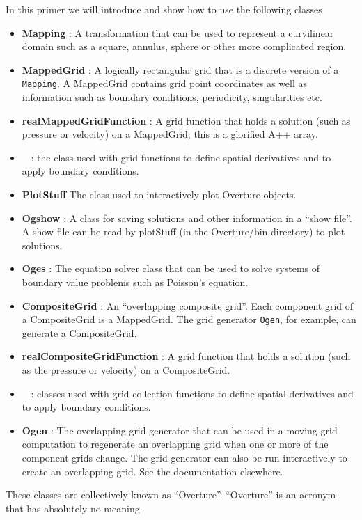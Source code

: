 \documentclass{article}
\begin{document}
In this primer we will introduce and show how to use the following
classes
\begin{itemize}
\item {\bf Mapping} : A transformation that can be used to represent a curvilinear domain
    such as a square, annulus, sphere or other more complicated region.
\item {\bf MappedGrid} : A logically rectangular grid that is a discrete version of a {\tt Mapping}.
  A MappedGrid contains grid point coordinates as well as information such as
  boundary conditions, periodicity, singularities etc.
\item {\bf realMappedGridFunction} : A grid function that holds a solution (such as pressure 
   or velocity) on a MappedGrid;  this is a glorified A++ array. 
\item {\bf \MGO~} : the class used with grid functions to define spatial derivatives
    and to apply boundary conditions.
\item {\bf PlotStuff} The class used to interactively plot Overture objects.
\item {\bf Ogshow} : A class for saving solutions and other information in a ``show file''.
    A show file can be read by plotStuff (in the Overture/bin directory) to plot solutions.
\item {\bf Oges} : The equation solver class that can be used to 
    solve systems of boundary value problems such as Poisson's equation.
\item {\bf CompositeGrid} : An ``overlapping composite grid''.
Each component grid of a CompositeGrid is a MappedGrid.
The grid generator {\tt Ogen}, for example, can generate a CompositeGrid.
\item {\bf realCompositeGridFunction} : A grid function that holds a solution
(such as the pressure or velocity) on a CompositeGrid.
\item {\bf \CGO~} : classes used with grid collection functions to define spatial derivatives
    and to apply boundary conditions.
\item {\bf Ogen} : The overlapping grid generator that can be used in a moving grid computation
    to regenerate an overlapping
    grid when one or more of the component grids change. The grid generator can also be run
    interactively to create an overlapping grid. See the documentation elsewhere.
\end{itemize}
These classes are collectively known as ``Overture''. ``Overture'' is an acronym
that has absolutely no meaning.
\end{document}

